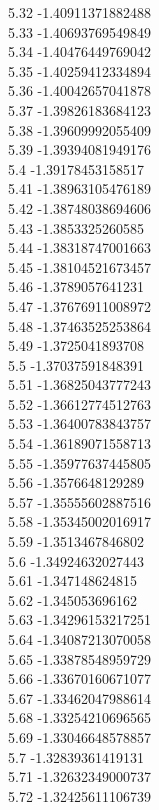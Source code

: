 {5.32	-1.40911371882488\\
5.33	-1.40693769549849\\
5.34	-1.40476449769042\\
5.35	-1.40259412334894\\
5.36	-1.40042657041878\\
5.37	-1.39826183684123\\
5.38	-1.39609992055409\\
5.39	-1.39394081949176\\
5.4	-1.39178453158517\\
5.41	-1.38963105476189\\
5.42	-1.38748038694606\\
5.43	-1.3853325260585\\
5.44	-1.38318747001663\\
5.45	-1.38104521673457\\
5.46	-1.3789057641231\\
5.47	-1.37676911008972\\
5.48	-1.37463525253864\\
5.49	-1.3725041893708\\
5.5	-1.37037591848391\\
5.51	-1.36825043777243\\
5.52	-1.36612774512763\\
5.53	-1.36400783843757\\
5.54	-1.36189071558713\\
5.55	-1.35977637445805\\
5.56	-1.3576648129289\\
5.57	-1.35555602887516\\
5.58	-1.35345002016917\\
5.59	-1.3513467846802\\
5.6	-1.34924632027443\\
5.61	-1.347148624815\\
5.62	-1.345053696162\\
5.63	-1.34296153217251\\
5.64	-1.34087213070058\\
5.65	-1.33878548959729\\
5.66	-1.33670160671077\\
5.67	-1.33462047988614\\
5.68	-1.33254210696565\\
5.69	-1.33046648578857\\
5.7	-1.32839361419131\\
5.71	-1.32632349000737\\
5.72	-1.32425611106739\\
}
